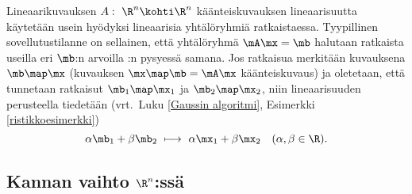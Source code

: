 Lineaarikuvauksen $A:\ \R^n \kohti \R^n$ käänteiskuvauksen lineaarisuutta käytetään usein
hyödyksi lineaarisia yhtälöryhmiä ratkaistaessa. Tyypillinen sovellutustilanne on sellainen,
että yhtälöryhmä $\mA\mx = \mb$ halutaan ratkaista useilla eri $\mb$:n arvoilla \mA:n pysyessä 
samana. Jos ratkaisua merkitään kuvauksena $\mb \map \mx$ (kuvauksen $\mx\map\mb=\mA\mx$ 
käänteiskuvaus) ja oletetaan, että tunnetaan ratkaisut $\mb_1 \map \mx_1$ ja 
$\mb_2 \map \mx_2$, niin lineaarisuuden perusteella tiedetään 
(vrt.\ Luku \ref{Gaussin algoritmi}, Esimerkki \ref{ristikkoesimerkki})
\[ 
\alpha \mb_1 + \beta \mb_2\ \longmapsto\ \alpha \mx_1 + \beta \mx_2 \quad (\alpha,\beta \in \R). 
\]

\subsection{Kannan vaihto $\R^n$:ssä}

